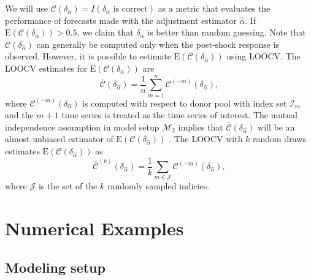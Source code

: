 \documentclass[11pt]{article}
\def\mc#1{\mathcal{#1}} %
\def\E#1{\mathrm{E}(#1)} %
\theoremstyle{definition}
\begin{document}
We will use 
$
	\mc{C}(\delta_{\hat\alpha}) 
	= I(\delta_{\hat{\alpha}} \text{ is correct})
$
as a metric that evaluates the performance of forecasts made with the adjustment estimator $\hat\alpha$. If $\E{\mc{C}(\delta_{\hat{\alpha}})} > 0.5$, we claim that $\delta_{\hat{\alpha}}$ is better than random guessing. Note that $\mc{C}(\delta_{\hat{\alpha}})$ can generally be computed only when the post-shock response is observed. However, it is possible to estimate $\E{\mc{C}(\delta_{\hat{\alpha}})}$ using LOOCV. %
The LOOCV estimates for $\E{\mc{C}(\delta_{\hat{\alpha}})}$ are
\begin{equation} \label{loocvm}
	 \bar{\mc{C}}(\delta_{\hat{\alpha}})= \frac{1}{n} \sum_{m = 1}^n \mc{C}^{(-m)}(\delta_{\hat{\alpha}}),
	\end{equation}
where $\mc{C}^{(-m)}(\delta_{\hat{\alpha}})$ is computed with respect to donor pool with index set $\mc{I}_m$ and the $m+1$ time series is treated as the time series of interest. The mutual independence assumption in model setup $\mc{M}_{2}$ implies that $\bar{\mc{C}}(\delta_{\hat{\alpha}})$ will be an almost unbiased estimator of $\E{\mc{C}(\delta_{\hat{\alpha}})}$ \citep[Page 222]{msos}.  The LOOCV with $k$ random draws estimates $\E{\mc{C}(\delta_{\hat{\alpha}})}$ as
\begin{equation} \label{loocvk}
	 \bar{\mc{C}}^{(k)}(\delta_{\hat{\alpha}})= \frac{1}{k} \sum_{m \in \mc{J}} \mc{C} ^{(-m)}(\delta_{\hat{\alpha}})	,
\end{equation}
where $\mc{J}$ is the set of the $k$ randomly sampled indicies. %


\section{Numerical Examples}
\label{simulation}

\subsection{Modeling setup}
\end{document}
